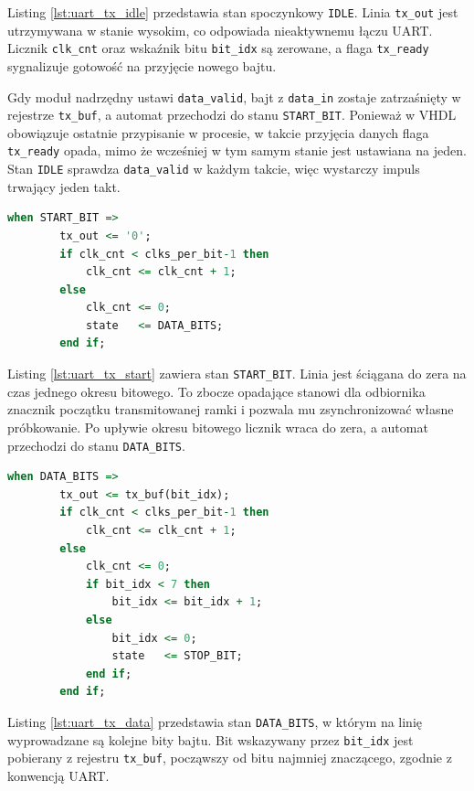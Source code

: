 Listing \ref{lst:uart_tx_idle} przedstawia stan spoczynkowy \texttt{IDLE}.
Linia \texttt{tx\_out} jest utrzymywana w stanie wysokim, co odpowiada
nieaktywnemu łączu UART. Licznik \texttt{clk\_cnt} oraz wskaźnik bitu
\texttt{bit\_idx} są zerowane, a flaga \texttt{tx\_ready} sygnalizuje gotowość
na przyjęcie nowego bajtu.

Gdy moduł nadrzędny ustawi \texttt{data\_valid}, bajt z \texttt{data\_in}
zostaje zatrzaśnięty w rejestrze \texttt{tx\_buf}, a automat przechodzi do
stanu \texttt{START\_BIT}. Ponieważ w VHDL obowiązuje ostatnie przypisanie
w procesie, w takcie przyjęcia danych flaga \texttt{tx\_ready} opada, mimo że
wcześniej w tym samym stanie jest ustawiana na jeden. Stan \texttt{IDLE}
sprawdza \texttt{data\_valid} w każdym takcie, więc wystarczy impuls trwający
jeden takt.

\begin{lstlisting}[language=VHDL,
caption={Stan START\_BIT automatu UART TX (uart\_tx.vhdl)},
label={lst:uart_tx_start}]
    when START_BIT =>
        tx_out <= '0';
        if clk_cnt < clks_per_bit-1 then
            clk_cnt <= clk_cnt + 1;
        else
            clk_cnt <= 0;
            state   <= DATA_BITS;
        end if;
\end{lstlisting}

Listing \ref{lst:uart_tx_start} zawiera stan \texttt{START\_BIT}. Linia jest
ściągana do zera na czas jednego okresu bitowego. To zbocze opadające stanowi
dla odbiornika znacznik początku transmitowanej ramki i pozwala mu
zsynchronizować własne próbkowanie. Po upływie okresu bitowego licznik wraca
do zera, a automat przechodzi do stanu \texttt{DATA\_BITS}.

\begin{lstlisting}[language=VHDL,
caption={Stan DATA\_BITS automatu UART TX (uart\_tx.vhdl)},
label={lst:uart_tx_data}]
    when DATA_BITS =>
        tx_out <= tx_buf(bit_idx);
        if clk_cnt < clks_per_bit-1 then
            clk_cnt <= clk_cnt + 1;
        else
            clk_cnt <= 0;
            if bit_idx < 7 then
                bit_idx <= bit_idx + 1;
            else
                bit_idx <= 0;
                state   <= STOP_BIT;
            end if;
        end if;
\end{lstlisting}

Listing \ref{lst:uart_tx_data} przedstawia stan \texttt{DATA\_BITS}, w którym
na linię wyprowadzane są kolejne bity bajtu. Bit wskazywany przez
\texttt{bit\_idx} jest pobierany z rejestru \texttt{tx\_buf}, począwszy od bitu
najmniej znaczącego, zgodnie z konwencją UART.

